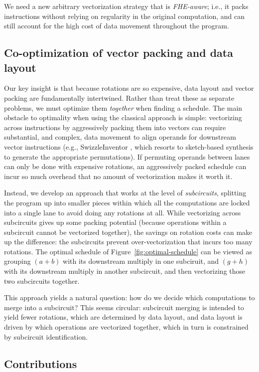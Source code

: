 We need a new arbitrary vectorization strategy that is {\em FHE-aware}; i.e., it packs instructions without relying on regularity in the original computation, and can still account for the high cost of data movement throughout the program.

\subsection*{Co-optimization of vector packing and data layout}
Our key insight is that because rotations are so expensive, data layout and vector packing are fundamentally intertwined. Rather than treat these as separate problems, we must optimize them {\em together} when finding a schedule.
The main obstacle to optimality when using the classical approach is simple: vectorizing across instructions by aggressively packing them into vectors can require substantial, and complex, data movement to align operands for downstream vector instructions (e.g., SwizzleInventor \cite{SwizzleInventor}, which resorts to sketch-based synthesis to generate the appropriate permutations). If permuting operands between lanes can only be done with expensive rotations, an aggressively packed schedule can incur so much overhead that no amount of vectorization makes it worth it.

Instead, we develop an approach that works at the level of {\em subcircuits}, splitting the program up into smaller pieces within which all the computations are locked into a single lane to avoid doing any rotations at all. While vectorizing across subcircuits gives up some packing potential (because operations within a subcircuit cannot be vectorized together), the savings on rotation costs can make up the difference: the subcircuits prevent over-vectorization that incurs too many rotations. The optimal schedule of Figure~\ref{fig:optimal-schedule} can be viewed as grouping $(a + b)$ with its downstream multiply in one subciruit, and $(g + h)$ with its downstream multiply in another subcircuit, and then vectorizing those two subcircuits together.

This approach yields a natural question: how do we decide which computations to merge into a subcircuit? This seems circular: subcircuit merging is intended to yield fewer rotations, which are determined by data layout, and data layout is driven by which operations are vectorized together, which in turn is constrained by subcircuit identification. 


\subsection*{Contributions}

